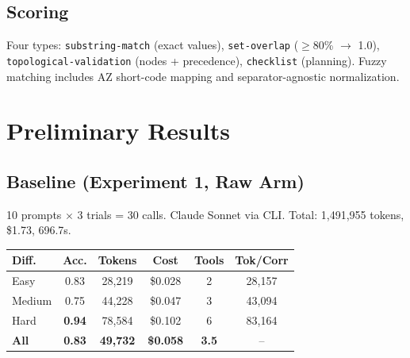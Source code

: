 \documentclass[10pt,twocolumn]{article}
\begin{document}
\subsection{Scoring}

Four types: \texttt{substring-match} (exact values), \texttt{set-overlap} ($\geq$80\% $\to$ 1.0), \texttt{topological-validation} (nodes + precedence), \texttt{checklist} (planning). Fuzzy matching includes AZ short-code mapping and separator-agnostic normalization.

\section{Preliminary Results}

\subsection{Baseline (Experiment 1, Raw Arm)}

10 prompts $\times$ 3 trials = 30 calls. Claude Sonnet via CLI. Total: 1,491,955 tokens, \$1.73, 696.7s.

\begin{table}[h]
\centering\small
\begin{tabular}{lccccc}
\toprule
\textbf{Diff.} & \textbf{Acc.} & \textbf{Tokens} & \textbf{Cost} & \textbf{Tools} & \textbf{Tok/Corr} \\
\midrule
Easy & 0.83 & 28,219 & \$0.028 & 2 & 28,157 \\
Medium & 0.75 & 44,228 & \$0.047 & 3 & 43,094 \\
Hard & \textbf{0.94} & 78,584 & \$0.102 & 6 & 83,164 \\
\midrule
\textbf{All} & \textbf{0.83} & \textbf{49,732} & \textbf{\$0.058} & \textbf{3.5} & -- \\
\bottomrule
\end{tabular}
\end{table}

\end{document}
